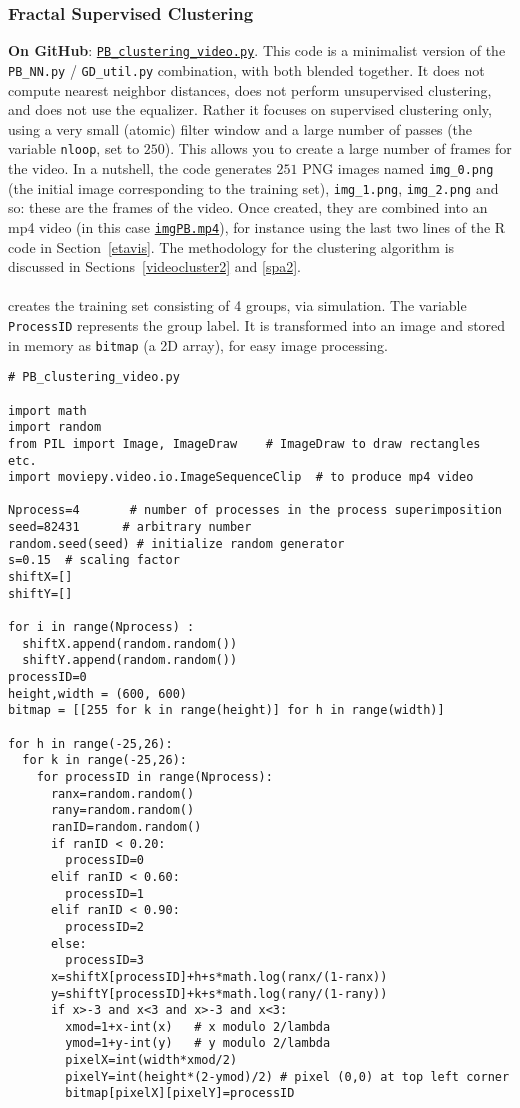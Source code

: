 \documentclass[10pt]{article}
\begin{document}
\subsubsection{Fractal Supervised Clustering}\label{codefr}
{\bf On GitHub}: \href{https://github.com/VincentGranville/Point-Processes/blob/main/Videos/PB_clustering_video.py}{\texttt{PB\_clustering\_video.py}}. This code is a minimalist version of the \texttt{PB\_NN.py} / \texttt{GD\_util.py} combination, with both blended together. It does not compute nearest neighbor distances, does not
perform unsupervised clustering, and does not use the equalizer. Rather it focuses on supervised clustering only, using a very small (atomic) filter window and a large number of passes (the variable \texttt{nloop}, set to $250$). This
allows you to create a large number of frames for the video. In a nutshell, the code generates $251$ PNG images named
\texttt{img\_0.png} (the initial image corresponding to the training set), \texttt{img\_1.png}, \texttt{img\_2.png} and so: these are the frames of the video.
 Once created, they are combined into an mp4 video
(in this case \href{https://www.youtube.com/watch?v=dNPSEh-X6uw}{\texttt{imgPB.mp4}}), for instance using the last two lines of the R code in Section~\ref{etavis}. The methodology for the clustering algorithm is discussed in Sections~\ref{videocluster2} and \ref{spa2}.\\
\quad \\
 creates the training set consisting of 4 groups, via simulation. The variable \texttt{ProcessID} represents the group label. It is transformed into an image and stored in memory as \texttt{bitmap} (a 2D array), for easy image processing.
\begin{lstlisting}
# PB_clustering_video.py

import math
import random
from PIL import Image, ImageDraw    # ImageDraw to draw rectangles etc.
import moviepy.video.io.ImageSequenceClip  # to produce mp4 video

Nprocess=4       # number of processes in the process superimposition
seed=82431      # arbitrary number
random.seed(seed) # initialize random generator
s=0.15  # scaling factor
shiftX=[]
shiftY=[]

for i in range(Nprocess) :
  shiftX.append(random.random())
  shiftY.append(random.random())
processID=0
height,width = (600, 600)
bitmap = [[255 for k in range(height)] for h in range(width)]

for h in range(-25,26):
  for k in range(-25,26):
    for processID in range(Nprocess):
      ranx=random.random()
      rany=random.random()
      ranID=random.random()
      if ranID < 0.20:
        processID=0
      elif ranID < 0.60:
        processID=1
      elif ranID < 0.90:
        processID=2
      else:
        processID=3
      x=shiftX[processID]+h+s*math.log(ranx/(1-ranx))
      y=shiftY[processID]+k+s*math.log(rany/(1-rany))
      if x>-3 and x<3 and x>-3 and x<3:
        xmod=1+x-int(x)   # x modulo 2/lambda
        ymod=1+y-int(y)   # y modulo 2/lambda
        pixelX=int(width*xmod/2)
        pixelY=int(height*(2-ymod)/2) # pixel (0,0) at top left corner
        bitmap[pixelX][pixelY]=processID
\end{lstlisting}
\end{document}
